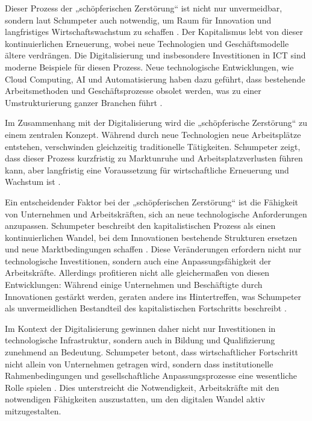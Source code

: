 Dieser Prozess der „schöpferischen Zerstörung“ ist nicht nur unvermeidbar, sondern laut 
Schumpeter auch notwendig, um Raum für Innovation und langfristiges Wirtschaftswachstum zu 
schaffen \parencite[vgl.][S. 83]{schumpeter1976capitalism}. Der Kapitalismus lebt von dieser 
kontinuierlichen Erneuerung, wobei neue Technologien und Geschäftsmodelle ältere verdrängen. 
Die Digitalisierung und insbesondere Investitionen in \ac{ICT} sind moderne Beispiele für 
diesen Prozess. Neue technologische Entwicklungen, wie Cloud Computing, \ac{AI} und 
Automatisierung haben dazu geführt, dass bestehende Arbeitsmethoden und Geschäftsprozesse 
obsolet werden, was zu einer Umstrukturierung ganzer Branchen führt 
\parencite[vgl.][S. 14–15]{frey2013thefuture}.

Im Zusammenhang mit der Digitalisierung wird die „schöpferische Zerstörung“ zu einem 
zentralen Konzept. Während durch neue Technologien neue Arbeitsplätze entstehen, 
verschwinden gleichzeitig traditionelle Tätigkeiten. Schumpeter zeigt, dass dieser 
Prozess kurzfristig zu Marktunruhe und Arbeitsplatzverlusten führen kann, aber langfristig 
eine Voraussetzung für wirtschaftliche Erneuerung und Wachstum ist 
\parencite[vgl.][S. 151–154]{schumpeter1976capitalism}.

Ein entscheidender Faktor bei der „schöpferischen Zerstörung“ ist die Fähigkeit von 
Unternehmen und Arbeitskräften, sich an neue technologische Anforderungen anzupassen. 
Schumpeter beschreibt den kapitalistischen Prozess als einen kontinuierlichen Wandel, 
bei dem Innovationen bestehende Strukturen ersetzen und neue Marktbedingungen schaffen 
\parencite[vgl.][S. 83–84]{schumpeter1976capitalism}. Diese Veränderungen erfordern 
nicht nur technologische Investitionen, sondern auch eine Anpassungsfähigkeit der 
Arbeitskräfte. Allerdings profitieren nicht alle gleichermaßen von diesen Entwicklungen: 
Während einige Unternehmen und Beschäftigte durch Innovationen gestärkt werden, geraten 
andere ins Hintertreffen, was Schumpeter als unvermeidlichen Bestandteil des 
kapitalistischen Fortschritts beschreibt 
\parencite[vgl.][S. 84–85]{schumpeter1976capitalism}.  

Im Kontext der Digitalisierung gewinnen daher nicht nur Investitionen in technologische 
Infrastruktur, sondern auch in Bildung und Qualifizierung zunehmend an Bedeutung. 
Schumpeter betont, dass wirtschaftlicher Fortschritt nicht allein von Unternehmen 
getragen wird, sondern dass institutionelle Rahmenbedingungen und gesellschaftliche 
Anpassungsprozesse eine wesentliche Rolle spielen 
\parencite[vgl.][S. 132–133]{schumpeter1976capitalism}. Dies unterstreicht die 
Notwendigkeit, Arbeitskräfte mit den notwendigen Fähigkeiten auszustatten, um den digitalen 
Wandel aktiv mitzugestalten.  

